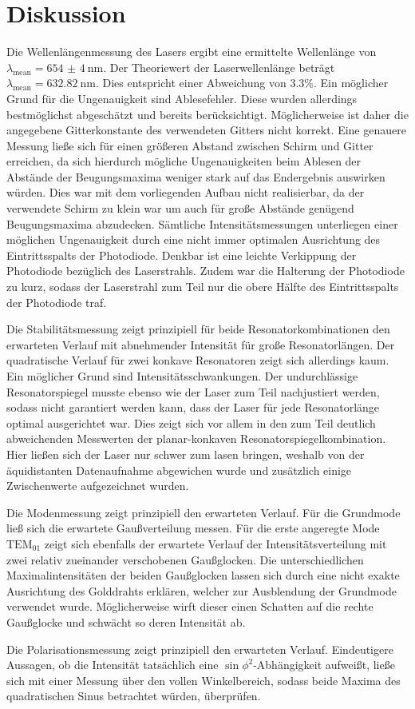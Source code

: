 \section{Diskussion}
\label{sec:Diskussion}
Die Wellenlängenmessung des Lasers ergibt eine ermittelte Wellenlänge von $\lambda_{\mathrm{mean}}=\SI{654(4)}{\nano\meter}$.
Der Theoriewert der Laserwellenlänge beträgt $\lambda_{\mathrm{mean}}=\SI{632.82}{\nano\meter}$. Dies entspricht einer Abweichung von $3.3\%$. Ein möglicher Grund für die Ungenauigkeit sind Ablesefehler. Diese wurden allerdings bestmöglichst abgeschätzt und bereits berücksichtigt. Möglicherweise ist daher die angegebene Gitterkonstante des verwendeten Gitters nicht korrekt. Eine genauere Messung ließe sich für einen größeren Abstand zwischen Schirm und Gitter erreichen, da sich hierdurch mögliche Ungenauigkeiten beim Ablesen der Abstände der Beugungsmaxima weniger stark auf das Endergebnis auswirken würden. Dies war mit dem vorliegenden Aufbau nicht realisierbar, da der verwendete Schirm zu klein war um auch für große Abstände genügend Beugungsmaxima abzudecken.
Sämtliche Intensitätsmessungen unterliegen einer möglichen Ungenauigkeit durch eine nicht immer optimalen Ausrichtung des Eintrittsspalts der Photodiode.
Denkbar ist eine leichte Verkippung der Photodiode bezüglich des Laserstrahls. Zudem war die Halterung der Photodiode zu kurz, sodass der Laserstrahl zum Teil nur die obere Hälfte des Eintrittsspalts der Photodiode traf.

Die Stabilitätsmessung zeigt prinzipiell für beide Resonatorkombinationen den erwarteten Verlauf mit abnehmender Intensität für große Resonatorlängen. Der quadratische Verlauf für zwei konkave Resonatoren zeigt sich allerdings kaum. Ein möglicher Grund sind Intensitätsschwankungen. Der undurchlässige Resonatorspiegel musste ebenso wie der Laser zum Teil nachjustiert werden, sodass nicht garantiert werden kann, dass der Laser für jede Resonatorlänge optimal ausgerichtet war. Dies zeigt sich vor allem in den zum Teil deutlich abweichenden Messwerten der planar-konkaven Resonatorspiegelkombination.
Hier ließen sich der Laser nur schwer zum lasen bringen, weshalb von der äquidistanten Datenaufnahme abgewichen wurde und zusätzlich einige Zwischenwerte aufgezeichnet wurden.

Die Modenmessung zeigt prinzipiell den erwarteten Verlauf. Für die Grundmode ließ sich die erwartete Gaußverteilung messen. Für die erste angeregte Mode $\text{TEM}_{01}$ zeigt sich ebenfalls der erwartete Verlauf der Intensitätsverteilung mit zwei relativ zueinander verschobenen Gaußglocken. Die unterschiedlichen Maximalintensitäten der beiden Gaußglocken lassen sich durch eine nicht exakte Ausrichtung des Golddrahts erklären, welcher zur Ausblendung der Grundmode verwendet wurde.
Möglicherweise wirft dieser einen Schatten auf die rechte Gaußglocke und schwächt so deren Intensität ab.

Die Polarisationsmessung zeigt prinzipiell den erwarteten Verlauf. Eindeutigere Aussagen, ob die Intensität tatsächlich eine $\sin{\phi}^2$-Abhängigkeit aufweißt, ließe sich mit einer Messung über den vollen Winkelbereich, sodass beide Maxima des quadratischen Sinus betrachtet würden, überprüfen.
